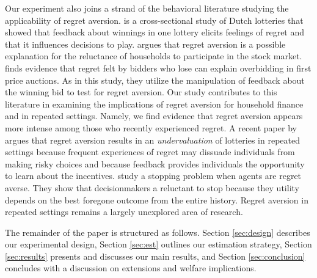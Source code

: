 \documentclass[12pt]{article}
\begin{document}
	Our experiment also joins a strand of the behavioral literature studying the applicability of regret aversion. \textcite{zeelenberg_consequences_2004} is a cross-sectional study of Dutch lotteries that showed that feedback about winnings in one lottery elicits feelings of regret and that it influences decisions to play. \textcite{barberis_individual_2006} argues that regret aversion is a possible explanation for the reluctance of households to participate in the stock market. \textcite{filiz-ozbay_auctions_2007} finds evidence that regret felt by bidders who lose can explain overbidding in first price auctions. As in this study, they utilize the manipulation of feedback about the winning bid to test for regret aversion. Our study contributes to this literature in examining the implications of regret aversion for household finance and in repeated settings. Namely, we find evidence that regret aversion appears more intense among those who recently experienced regret. A recent paper by \textcite{imas_regret_2016} argues that regret aversion results in an \emph{undervaluation} of lotteries in repeated settings because frequent experiences of regret may dissuade individuals from making risky choices and because feedback provides individuals the opportunity to learn about the incentives. \textcite{strack_too_2019} study a stopping problem when agents are regret averse. They show that decisionmakers a reluctant to stop because they utility depends on the best foregone outcome from the entire history. Regret aversion in repeated settings remains a largely unexplored area of research.

	The remainder of the paper is structured as follows. Section \ref{sec:design} describes our experimental design, Section \ref{sec:est} outlines our estimation strategy, Section \ref{sec:results} presents and discusses our main results, and Section \ref{sec:conclusion} concludes with a discussion on extensions and welfare implications.


\end{document}
